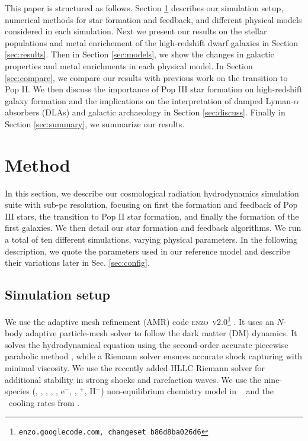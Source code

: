 \documentclass[useAMS,usenatbib]{mn2e}
\begin{document}
This paper is structured as follows.  Section \ref{sec:setup}
describes our simulation setup, numerical methods for star formation
and feedback, and different physical models considered in each
simulation.  Next we present our results on the stellar populations
and metal enrichement of the high-redshift dwarf galaxies in Section
\ref{sec:results}.  Then in Section \ref{sec:models}, we show the
changes in galactic properties and metal enrichments in each physical
model.  In Section \ref{sec:compare}, we compare our results with
previous work on the transition to Pop II.  We then discuss the
importance of Pop III star formation on high-redshift galaxy
formation and the implications on the interpretation of damped
Lyman-$\alpha$ absorbers (DLAs) and galactic archaeology in Section
\ref{sec:discuss}.  Finally in Section \ref{sec:summary}, we summarize
our results.

\section{Method}
\label{sec:setup}

In this section, we describe our cosmological radiation hydrodynamics
simulation suite with sub-pc resolution, focusing on first the
formation and feedback of Pop III stars, the transition to Pop II star
formation, and finally the formation of the first galaxies.  We then
detail our star formation and feedback algorithms.  We run a total of
ten different simulations, varying physical parameters.  In the
following description, we quote the parameters used in our reference
model and describe their variations later in Sec. \ref{sec:config}.

\subsection{Simulation setup}

We use the adaptive mesh refinement (AMR) code
\textsc{enzo~v2.0}\footnote{\texttt{enzo.googlecode.com, changeset
    b86d8ba026d6}} \citep{OShea2004}.  It uses an $N$-body adaptive
particle-mesh solver \citep{Efstathiou85} to follow the dark matter
(DM) dynamics.  It solves the hydrodynamical equation using the
second-order accurate piecewise parabolic method \citep{Woodward84,
  Bryan95}, while a Riemann solver ensures accurate shock capturing
with minimal viscosity.  We use the recently added HLLC Riemann solver
\citep{Toro94_HLLC} for additional stability in strong shocks and
rarefaction waves.  We use the nine-species (\hi, \hii, \hei, \heii,
\heiii, e$^-$, \hh, \hh$^+$, H$^-$) non-equilibrium chemistry model in
\enzo~\citep{Abel97, Anninos97} and the \hh~cooling rates from
\citet{Glover08_Rates}.
\end{document}
